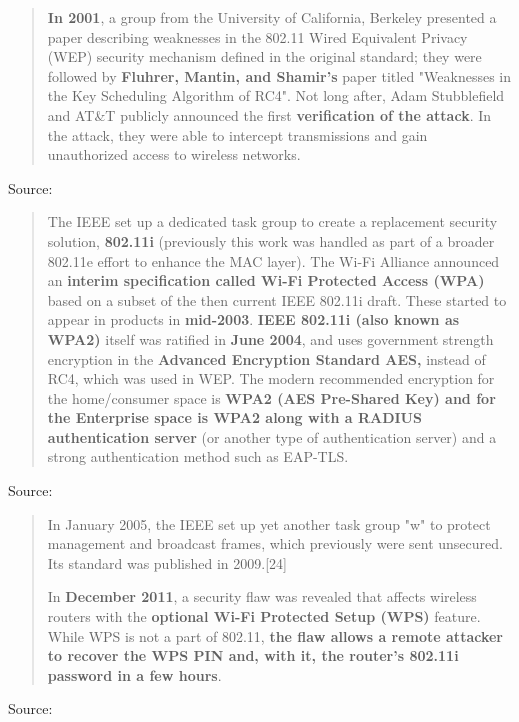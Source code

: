 \documentclass[Screen16to9,17pt]{foils}
\begin{document}

\begin{quote}
{\bf In 2001}, a group from the University of California, Berkeley presented a paper describing weaknesses in the 802.11 Wired Equivalent Privacy (WEP) security mechanism defined in the original standard; they were followed by {\bf Fluhrer, Mantin, and Shamir's} paper titled "Weaknesses in the Key Scheduling Algorithm of RC4". Not long after, Adam Stubblefield and AT\&T publicly announced the first {\bf verification of the attack}. In the attack, they were able to intercept transmissions and gain unauthorized access to wireless networks.
\end{quote}
Source: 


\begin{quote}
The IEEE set up a dedicated task group to create a replacement security solution, {\bf 802.11i} (previously this work was handled as part of a broader 802.11e effort to enhance the MAC layer). The Wi-Fi Alliance announced an {\bf interim specification called Wi-Fi Protected Access (WPA)} based on a subset of the then current IEEE 802.11i draft. These started to appear in products in {\bf mid-2003}. {\bf IEEE 802.11i (also known as WPA2)} itself was ratified in {\bf June 2004}, and uses government strength encryption in the {\bf Advanced Encryption Standard AES,} instead of RC4, which was used in WEP. The modern recommended encryption for the home/consumer space is {\bf WPA2 (AES Pre-Shared Key) and for the Enterprise space is WPA2 along with a RADIUS authentication server} (or another type of authentication server) and a strong authentication method such as EAP-TLS.
\end{quote}
Source: 


\begin{quote}
In January 2005, the IEEE set up yet another task group "w" to protect management and broadcast frames, which previously were sent unsecured. Its standard was published in 2009.[24]

In {\bf December 2011}, a security flaw was revealed that affects wireless routers with the {\bf optional Wi-Fi Protected Setup (WPS)} feature. While WPS is not a part of 802.11, {\bf the flaw allows a remote attacker to recover the WPS PIN and, with it, the router's 802.11i password in a few hours}.
\end{quote}
Source: 
\end{document}
